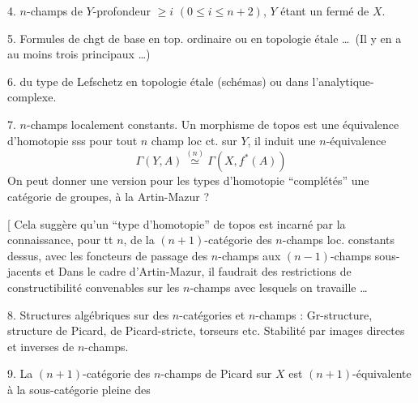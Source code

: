 
4.  $n$-champs  de $Y$-profondeur $\geq i$ \quad $(0\leq i\leq n+2)$, $Y$
étant un fermé de $X$.

5. Formules de chgt de base en top. ordinaire 
ou en topologie étale \ldots\ (Il y en a au moins trois  
principaux \ldots)

6.   du type de Lefschetz  en topologie
étale (schémas) ou dans l'analytique-complexe.

7. $n$-champs localement constants.
Un morphisme de topos  est une équivalence d'homotopie
sss pour tout $n$ champ loc ct.  sur $Y$,
il induit une $n$-équivalence
\[
\Gamma(Y,A)\mathrel{\overset{(n)}{\simeq}}\Gamma(X,f^*(A))
\]
On peut donner une version pour les types
d'homotopie ``complétés''  une catégorie de groupes,
à la Artin-Mazur ?

 [ Cela suggère qu'un ``type d'homotopie'' de topos
est incarné par la connaissance, pour tt $n$,
de la $(n+1)$-catégorie des $n$-champs loc. constants
dessus, avec les foncteurs de passage des  $n$-champs aux $(n-1)$-champs sous-jacents et 
Dans le cadre d'Artin-Mazur, il faudrait des
restrictions de constructibilité convenables sur les
$n$-champs avec lesquels on travaille \ldots

8. Structures algébriques sur des $n$-catégories et
$n$-champs : Gr-structure, structure de Picard,
de Picard-stricte, torseurs etc. Stabilité par images
directes et inverses de $n$-champs.

9. La $(n+1)$-catégorie des $n$-champs de Picard  sur $X$
est $(n+1)$-équivalente à la sous-catégorie pleine des
